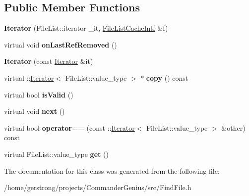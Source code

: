 \subsection*{Public Member Functions}
\begin{DoxyCompactItemize}
\item 
\hypertarget{class_file_list_cache_intf_1_1_iterator_a502cb5fbabf37b9c728293eb9b24cb7a}{
{\bfseries Iterator} (FileList::iterator \_\-it, \hyperlink{class_file_list_cache_intf}{FileListCacheIntf} \&f)}
\label{class_file_list_cache_intf_1_1_iterator_a502cb5fbabf37b9c728293eb9b24cb7a}

\item 
\hypertarget{class_file_list_cache_intf_1_1_iterator_af714dc7888f5da4995cd8ec3f6ac2458}{
virtual void {\bfseries onLastRefRemoved} ()}
\label{class_file_list_cache_intf_1_1_iterator_af714dc7888f5da4995cd8ec3f6ac2458}

\item 
\hypertarget{class_file_list_cache_intf_1_1_iterator_aa5a87f2b3f9a8f795570dbc473261ebb}{
{\bfseries Iterator} (const \hyperlink{class_file_list_cache_intf_1_1_iterator}{Iterator} \&it)}
\label{class_file_list_cache_intf_1_1_iterator_aa5a87f2b3f9a8f795570dbc473261ebb}

\item 
\hypertarget{class_file_list_cache_intf_1_1_iterator_a95998a852b482c22d0b19dd6a2450611}{
virtual ::\hyperlink{class_file_list_cache_intf_1_1_iterator}{Iterator}$<$ FileList::value\_\-type $>$ $\ast$ {\bfseries copy} () const }
\label{class_file_list_cache_intf_1_1_iterator_a95998a852b482c22d0b19dd6a2450611}

\item 
\hypertarget{class_file_list_cache_intf_1_1_iterator_a19348f9d47c516d93601be65daa3b275}{
virtual bool {\bfseries isValid} ()}
\label{class_file_list_cache_intf_1_1_iterator_a19348f9d47c516d93601be65daa3b275}

\item 
\hypertarget{class_file_list_cache_intf_1_1_iterator_ac9dca7798f6d3e78a307054cc13c27d0}{
virtual void {\bfseries next} ()}
\label{class_file_list_cache_intf_1_1_iterator_ac9dca7798f6d3e78a307054cc13c27d0}

\item 
\hypertarget{class_file_list_cache_intf_1_1_iterator_af67d862548be480e94d22399dacbd9b7}{
virtual bool {\bfseries operator==} (const ::\hyperlink{class_file_list_cache_intf_1_1_iterator}{Iterator}$<$ FileList::value\_\-type $>$ \&other) const }
\label{class_file_list_cache_intf_1_1_iterator_af67d862548be480e94d22399dacbd9b7}

\item 
\hypertarget{class_file_list_cache_intf_1_1_iterator_a9c7e5ad8b1f7504927c99b3a153479d0}{
virtual FileList::value\_\-type {\bfseries get} ()}
\label{class_file_list_cache_intf_1_1_iterator_a9c7e5ad8b1f7504927c99b3a153479d0}

\end{DoxyCompactItemize}


The documentation for this class was generated from the following file:\begin{DoxyCompactItemize}
\item 
/home/gerstrong/projects/CommanderGenius/src/FindFile.h\end{DoxyCompactItemize}
